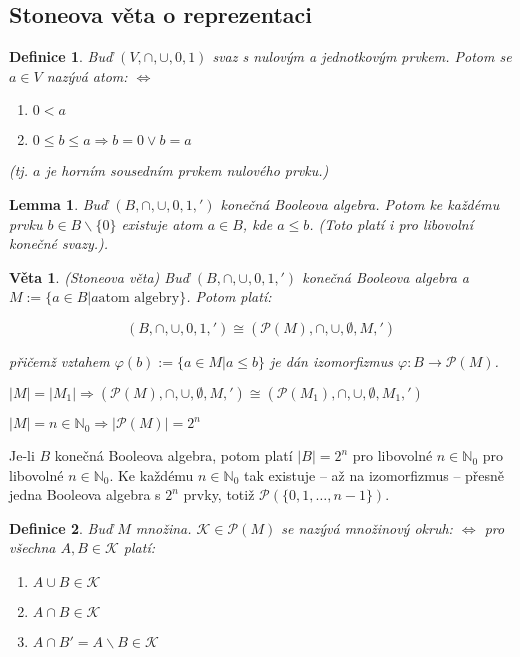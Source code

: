 \documentclass[a4paper, 11pt]{report}
\newtheorem{mydef}{Definice}[chapter]
\newtheorem{veta}{Věta}
\newtheorem{lemma}{Lemma}
\begin{document}
\subsection{Stoneova věta o reprezentaci}
\begin{mydef}
Buď $(V, \cap, \cup, 0, 1)$ svaz s nulovým a jednotkovým prvkem. Potom se $a \in V$ nazývá \emph{atom}: $\Leftrightarrow$
\begin{enumerate}[1)]
	\item $0 < a$
	\item $0 \leq b \leq a \Rightarrow b = 0 \lor b = a$
\end{enumerate}
(tj. $a$ je horním sousedním prvkem nulového prvku.)
\end{mydef}

\begin{lemma}
Buď $(B, \cap, \cup, 0, 1, ')$ konečná Booleova algebra. Potom ke každému prvku $b \in B \backslash \{0\}$ existuje atom $a \in B$, kde $a \leq b$. (Toto platí i pro libovolní konečné svazy.).
\end{lemma}

\begin{veta}
(Stoneova věta) Buď $(B, \cap, \cup, 0, 1, ')$ konečná Booleova algebra a $M := \{a \in B | a \text{atom algebry} \}$. Potom platí:

$$ (B, \cap, \cup, 0, 1, ') \cong (\mathcal{P}(M), \cap, \cup, \emptyset, M, ')$$

přičemž  vztahem $\varphi(b) := \{a \in M | a \leq b\}$ je dán izomorfizmus $\varphi: B \to \mathcal{P}(M)$.
\end{veta}

$|M| = |M_1| \Rightarrow (\mathcal{P}(M), \cap, \cup, \emptyset, M, ') \cong (\mathcal{P}(M_1), \cap, \cup, \emptyset, M_1, ')$

$|M| = n \in \mathbb{N}_0 \Rightarrow |\mathcal{P}(M)| = 2^n$

Je-li $B$ konečná Booleova algebra, potom platí $|B| = 2^n$ pro libovolné $n \in \mathbb{N}_0$ pro libovolné $n \in \mathbb{N}_0$. Ke každému $n \in \mathbb{N}_0$ tak existuje -- až na izomorfizmus -- přesně jedna Booleova algebra s $2^n$ prvky, totiž $\mathcal{P}(\{0, 1, \dots, n-1\})$.

\begin{mydef}
Buď $M$ množina.  $\mathcal{K} \in \mathcal{P}(M)$ se nazývá množinový okruh: $\Leftrightarrow$ pro všechna $A, B \in \mathcal{K}$ platí:
\begin{enumerate}[1)]
	\item $A \cup B \in \mathcal{K}$
	\item $A \cap B \in \mathcal{K}$
	\item $A \cap B' = A \backslash B \in \mathcal{K}$
\end{enumerate}
\end{mydef}
\end{document}
